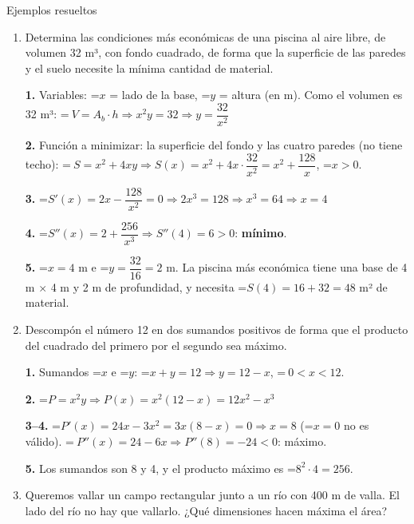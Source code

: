 \documentclass[11pt,a4paper]{article}
\newcommand{\lt}{<}\newcommand{\gt}{>}
\newcommand{\fmm}[1]{\setbox0=\hbox{$#1$}\ifdim\wd0>\linewidth\[#1\]\else\mbox{\box0}\fi}
\begin{document}
  
\begin{fmex}{Ejemplos resueltos}
\begin{enumerate}[label=\textbf{\arabic*.},leftmargin=*]
\item Determina las condiciones más económicas de una piscina al aire libre, de volumen 32 m³, con fondo cuadrado, de forma que la superficie de las paredes y el suelo necesite la mínima cantidad de material.
          

            

\textbf{1.} Variables: \fmm{x} = lado de la base, \fmm{y} = altura (en m). Como el volumen es 32 m³: \fmm{\ V=A_b\cdot h\Rightarrow x^2y=32\Rightarrow y=\dfrac{32}{x^2}}

            

\textbf{2.} Función a minimizar: la superficie del fondo y las cuatro paredes (no tiene techo): \fmm{\ S=x^2+4xy\Rightarrow S(x)=x^2+4x\cdot\dfrac{32}{x^2}=x^2+\dfrac{128}{x}}, \fmm{x\gt0}.

            

\textbf{3.} \fmm{S'(x)=2x-\dfrac{128}{x^2}=0\Rightarrow 2x^3=128\Rightarrow x^3=64\Rightarrow x=4}

            

\textbf{4.} \fmm{S''(x)=2+\dfrac{256}{x^3}\Rightarrow S''(4)=6\gt0}: \textbf{mínimo}.

            

\textbf{5.} \fmm{x=4} m e \fmm{y=\dfrac{32}{16}=2} m. La piscina más económica tiene una base de 4 m $\times$ 4 m y 2 m de profundidad, y necesita \fmm{S(4)=16+32=48} m² de material.
\item Descompón el número 12 en dos sumandos positivos de forma que el producto del cuadrado del primero por el segundo sea máximo.
          

            

\textbf{1.} Sumandos \fmm{x} e \fmm{y}: \fmm{x+y=12\Rightarrow y=12-x}, \fmm{\ 0\lt x\lt12}.

            

\textbf{2.} \fmm{P=x^2y\Rightarrow P(x)=x^2(12-x)=12x^2-x^3}

            

\textbf{3--4.} \fmm{P'(x)=24x-3x^2=3x(8-x)=0\Rightarrow x=8} (\fmm{x=0} no es válido). \fmm{\ P''(x)=24-6x\Rightarrow P''(8)=-24\lt0}: máximo.

            

\textbf{5.} Los sumandos son 8 y 4, y el producto máximo es \fmm{8^2\cdot4=256}.
\item Queremos vallar un campo rectangular junto a un río con 400 m de valla. El lado del río no hay que vallarlo. ¿Qué dimensiones hacen máxima el área?
          


\end{enumerate}
\end{fmex}
\end{document}
